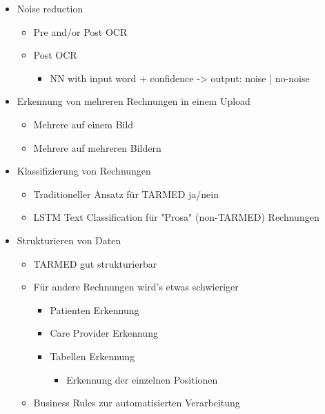 \documentclass[12pt, twoside, table]{extarticle}
\begin{document}
\begin{itemize}
\begin{itemize}
\begin{itemize}
        \end{itemize}
    \end{itemize}
    \item Noise reduction
    \begin{itemize}
	    \item Pre and/or Post OCR
        \item Post OCR
        \begin{itemize}
	    	\item NN with input word + confidence -> output: noise | no-noise
        \end{itemize}
    \end{itemize}
    \item Erkennung von mehreren Rechnungen in einem Upload
    \begin{itemize}
	    \item Mehrere auf einem Bild
	    \item Mehrere auf mehreren Bildern
    \end{itemize}
    \item Klassifizierung von Rechnungen
    \begin{itemize}
		\item Traditioneller Ansatz für TARMED ja/nein
		\item LSTM Text Classification für "Prosa" (non-TARMED) Rechnungen
    \end{itemize}
    \item Strukturieren von Daten
    \begin{itemize}
		\item TARMED gut strukturierbar
		\item Für andere Rechnungen wird’s etwas schwieriger
        \begin{itemize}
			\item Patienten Erkennung
			\item Care Provider Erkennung
			\item Tabellen Erkennung
            \begin{itemize}
			    \item Erkennung der einzelnen Positionen
            \end{itemize}
        \end{itemize}
        \item Business Rules zur automatisierten Verarbeitung    
    \end{itemize}  
\end{itemize}
\end{document}
